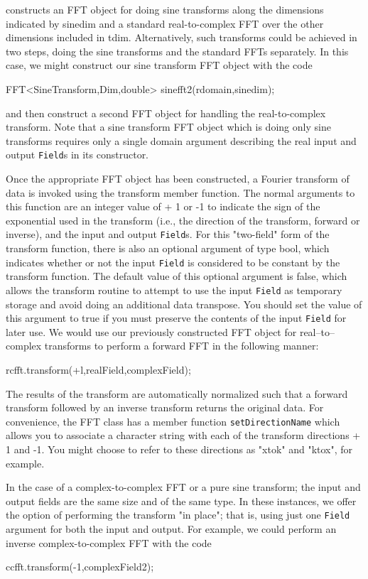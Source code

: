 constructs an FFT object for doing sine transforms along the dimensions indicated by sinedim and a standard real-to-complex FFT over the other dimensions included in tdim. Alternatively, such transforms could be achieved in two steps, doing the sine transforms and the standard FFTs separately. In this case, we might construct our sine transform FFT object with the code
\begin{smallcode}
FFT<SineTransform,Dim,double> sinefft2(rdomain,sinedim); 
\end{smallcode}


and then construct a second FFT object for handling the real-to-complex transform. Note that a sine transform FFT object which is doing only sine transforms requires only a single domain argument describing the real input and output \texttt{Field}s in its constructor.

Once the appropriate FFT object has been constructed, a Fourier transform of data is invoked using the transform member function. The normal arguments to this function are an integer value of + 1 or -1 to indicate the sign of the exponential used in the transform (i.e., the direction of the transform, forward or inverse), and the input and output \texttt{Field}s. For this "two-field" form of the transform function, there is also an optional argument of type bool, which indicates whether or not the input \texttt{Field} is considered to be constant by the transform function. The default value of this optional argument is false, which allows the transform routine to attempt to use the input \texttt{Field} as temporary storage and avoid doing an additional data transpose. You should set the value of this argument to true if you must preserve the contents of the input \texttt{Field} for later use. We would use our previously constructed FFT object for real--to--complex transforms to perform a forward FFT in the following manner:
\begin{smallcode}
rcfft.transform(+l,realField,complexField);
\end{smallcode}
 

The results of the transform are automatically normalized such that a forward transform followed by an inverse transform returns the original data. For convenience, the FFT class has a member function \texttt{setDirectionName} which allows you to associate a character string with each of the transform directions + 1 and -1. You might choose to refer to these directions as "xtok" and "ktox", for example.

In the case of a complex-to-complex FFT or a pure sine transform; the input and output fields are the same size and of the same type. In these instances, we offer the option of performing the transform "in place"; that is, using just one \texttt{Field} argument for both the input and output. For example, we could perform an inverse complex-to-complex FFT with the code
\begin{smallcode}
ccfft.transform(-1,complexField2); 
\end{smallcode}



